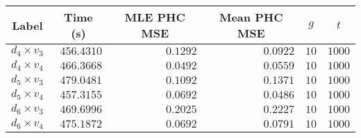 \begin{tabular}{lrrrrr}
  \toprule
  \multicolumn{1}{c}{Label} & \multicolumn{1}{c}{Time (s)} & \multicolumn{1}{c}{MLE PHC MSE} & \multicolumn{1}{c}{Mean PHC MSE} & \multicolumn{1}{c}{$g$} & \multicolumn{1}{c}{$t$} \\
  \midrule
   $d_4 \times v_3$ &                   $456.4310$ &                        $0.1292$ &                         $0.0922$ &                    $10$ &                  $1000$ \\
   $d_4 \times v_4$ &                   $466.3668$ &                        $0.0492$ &                         $0.0559$ &                    $10$ &                  $1000$ \\
   $d_5 \times v_3$ &                   $479.0481$ &                        $0.1092$ &                         $0.1371$ &                    $10$ &                  $1000$ \\
   $d_5 \times v_4$ &                   $457.3155$ &                        $0.0692$ &                         $0.0486$ &                    $10$ &                  $1000$ \\
   $d_6 \times v_3$ &                   $469.6996$ &                        $0.2025$ &                         $0.2227$ &                    $10$ &                  $1000$ \\
   $d_6 \times v_4$ &                   $475.1872$ &                        $0.0692$ &                         $0.0791$ &                    $10$ &                  $1000$ \\
  \bottomrule
\end{tabular}
